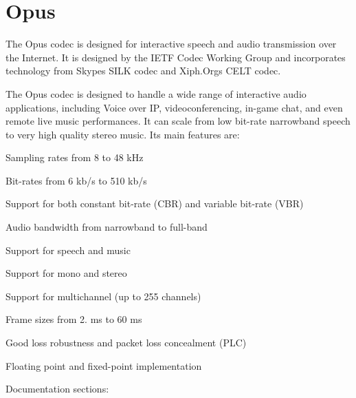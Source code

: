 \chapter{Opus}
\hypertarget{index}{}\label{index}
The Opus codec is designed for interactive speech and audio transmission over the Internet. It is designed by the IETF Codec Working Group and incorporates technology from Skype\textquotesingle{}s SILK codec and Xiph.\+Org\textquotesingle{}s CELT codec.

The Opus codec is designed to handle a wide range of interactive audio applications, including Voice over IP, videoconferencing, in-\/game chat, and even remote live music performances. It can scale from low bit-\/rate narrowband speech to very high quality stereo music. Its main features are\+:

\begin{DoxyItemize}
\item Sampling rates from 8 to 48 k\+Hz \item Bit-\/rates from 6 kb/s to 510 kb/s \item Support for both constant bit-\/rate (CBR) and variable bit-\/rate (VBR) \item Audio bandwidth from narrowband to full-\/band \item Support for speech and music \item Support for mono and stereo \item Support for multichannel (up to 255 channels) \item Frame sizes from 2. ms to 60 ms \item Good loss robustness and packet loss concealment (PLC) \item Floating point and fixed-\/point implementation\end{DoxyItemize}
Documentation sections\+: \begin{DoxyItemize}
\item {} \item {} \item {} \item {} \item {} \item {} \end{DoxyItemize}
